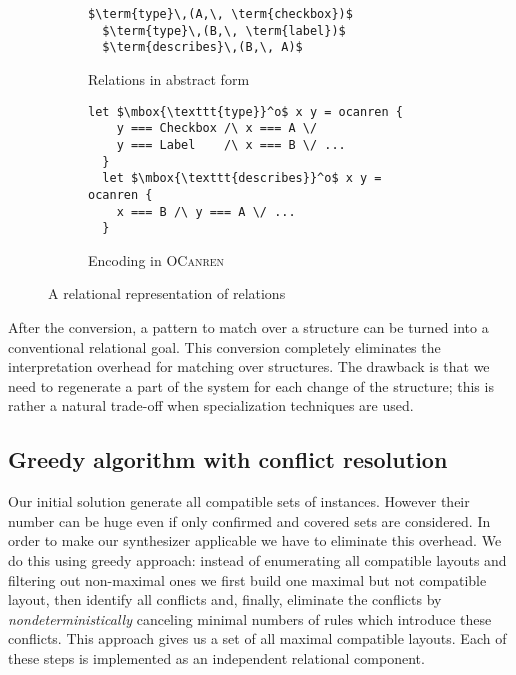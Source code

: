 \begin{figure}[t]
  \begin{subfigure}[t]{0.5\textwidth}
    \begin{lstlisting}[basicstyle=\small,language=ocanren]
  $\term{type}\,(A,\, \term{checkbox})$
  $\term{type}\,(B,\, \term{label})$
  $\term{describes}\,(B,\, A)$
    \end{lstlisting}
    \caption{Relations in abstract form}
    \label{rel_abs}
  \end{subfigure}
  \begin{subfigure}[t]{0.5\textwidth}
    \begin{lstlisting}[basicstyle=\small,language=ocanren]
  let $\mbox{\texttt{type}}^o$ x y = ocanren {
    y === Checkbox /\ x === A \/
    y === Label    /\ x === B \/ ...
  }
  let $\mbox{\texttt{describes}}^o$ x y = ocanren {
    x === B /\ y === A \/ ...
  }
    \end{lstlisting}
    \caption{Encoding in \textsc{OCanren}}
    \label{rel_con}
  \end{subfigure}
  \caption{A relational representation of relations}
  \label{rel_rel}
\end{figure}

After the conversion, a pattern to match over a structure can be turned into a conventional relational goal. This conversion
completely eliminates the interpretation overhead for matching over structures. The drawback is that we need to regenerate a
part of the system for each change of the structure; this is rather a natural trade-off when specialization techniques are used.

\subsection{Greedy algorithm with conflict resolution}

Our initial solution generate all compatible sets of instances. However their number can be huge even if
only confirmed and covered sets are considered. In order to make our synthesizer applicable we have to eliminate
this overhead. We do this using greedy approach: instead of enumerating all compatible layouts and
filtering out non-maximal ones we first build one maximal but not compatible layout, then identify all conflicts and,
finally, eliminate the conflicts by \emph{nondeterministically} canceling minimal numbers of rules
which introduce these conflicts. This approach gives us a set of all maximal compatible layouts.
Each of these steps is implemented as an independent relational component.

